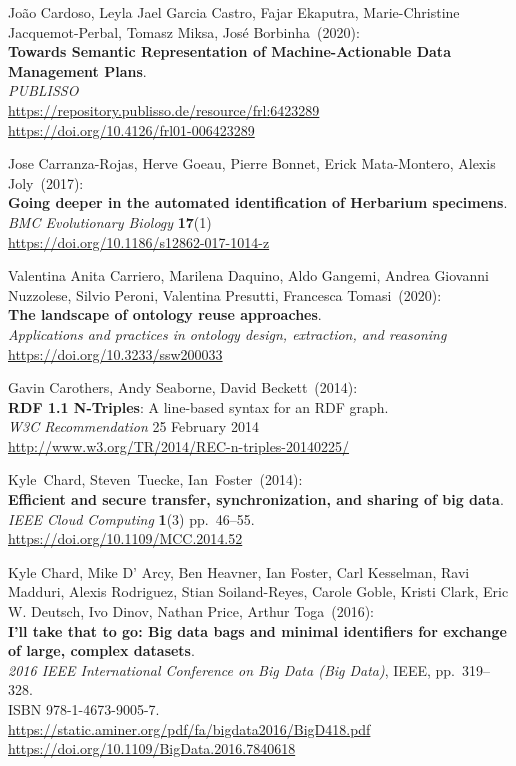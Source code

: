 \begin{thebibliography}{9}
João Cardoso, Leyla Jael Garcia Castro, Fajar Ekaputra, Marie-Christine Jacquemot-Perbal, Tomasz Miksa, José Borbinha~(2020): \\
\textbf{Towards Semantic Representation of Machine-Actionable Data Management Plans}.\\
\emph{PUBLISSO}\\
\url{https://repository.publisso.de/resource/frl:6423289}\\
\url{https://doi.org/10.4126/frl01-006423289}

Jose Carranza-Rojas, Herve Goeau, Pierre Bonnet, Erick Mata-Montero, Alexis Joly~(2017): \\
\textbf{Going deeper in the automated identification of Herbarium specimens}.\\
\emph{BMC Evolutionary Biology} \textbf{17}(1)\\
\url{https://doi.org/10.1186/s12862-017-1014-z}

Valentina Anita Carriero, Marilena Daquino, Aldo Gangemi, Andrea Giovanni Nuzzolese, Silvio Peroni, Valentina Presutti, Francesca Tomasi~(2020): \\
\textbf{The landscape of ontology reuse approaches}. \\
\emph{Applications and practices in ontology design, extraction, and reasoning} \\
\url{https://doi.org/10.3233/ssw200033}

Gavin Carothers, Andy Seaborne, David Beckett~(2014): \\
\textbf{RDF 1.1 N-Triples}: A line-based syntax for an RDF graph.\\
\emph{W3C Recommendation} 25 February 2014\\
\url{http://www.w3.org/TR/2014/REC-n-triples-20140225/}


Kyle~Chard, Steven~Tuecke, Ian~Foster~(2014): \\
\textbf{Efficient and secure transfer, synchronization, and sharing of big data}.\\
\emph{IEEE Cloud Computing} \textbf{1}(3) pp.~46--55.\\
\url{https://doi.org/10.1109/MCC.2014.52}

Kyle Chard, Mike D' Arcy, Ben Heavner, Ian Foster, Carl Kesselman, Ravi Madduri, Alexis Rodriguez, Stian Soiland-Reyes, Carole Goble, Kristi Clark, Eric W. Deutsch, Ivo Dinov, Nathan Price, Arthur Toga~(2016): \\
\textbf{I'll take that to go: Big data bags and minimal identifiers for exchange of large, complex datasets}.\\
\emph{2016 IEEE International Conference on Big Data (Big Data)}, IEEE,
pp.~319--328.\\
ISBN 978-1-4673-9005-7.\\
\url{https://static.aminer.org/pdf/fa/bigdata2016/BigD418.pdf}\\
\url{https://doi.org/10.1109/BigData.2016.7840618}


\end{thebibliography}
